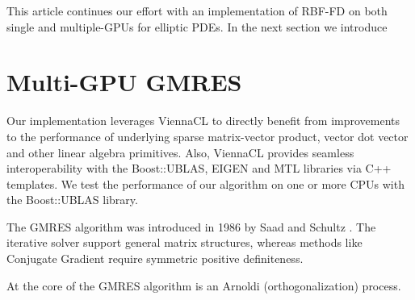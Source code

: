 This article continues our effort with an implementation of RBF-FD on both single and multiple-GPUs for elliptic PDEs. In the next section we introduce 

%
%
%
%
%
%

\section{Multi-GPU GMRES}

Our implementation leverages ViennaCL to directly benefit from improvements to the performance of underlying sparse matrix-vector product, vector dot vector and other linear algebra primitives. Also, ViennaCL provides seamless interoperability with the Boost::UBLAS, EIGEN and MTL libraries via C++ templates. We test the performance of our algorithm on one or more CPUs with the Boost::UBLAS library. 


The GMRES algorithm was introduced in 1986 by Saad and Schultz \cite{Saad1986}. The iterative solver support general matrix structures, whereas methods like Conjugate Gradient require symmetric positive definiteness. 


At the core of the GMRES algorithm is an Arnoldi (orthogonalization) process. %

